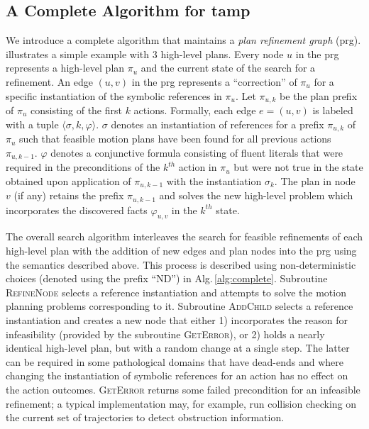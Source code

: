 \subsection{A Complete Algorithm for {\sc tamp}}
We introduce a complete algorithm that maintains a \emph{plan
  refinement graph} ({\sc prg}).  illustrates a simple example with 3 high-level plans.
Every node $u$ in the {\sc prg}
represents a high-level plan $\pi_u$ and the current state of the search
for a refinement. An edge $(u,v)$ in the {\sc prg}
represents a ``correction'' of $\pi_u$ for a specific instantiation of
the symbolic references in $\pi_u$. Let $\pi_{u,k}$ be the plan prefix of
$\pi_u$ consisting of the first $k$ actions. Formally, each edge
$e=(u,v)$ is labeled with a tuple $\langle \sigma, k, \varphi \rangle$.
$\sigma$ denotes an instantiation of references for a prefix $\pi_{u,k}$ of
$\pi_u$ such that feasible motion plans have been found for all
previous actions $\pi_{u,k-1}$. $\varphi$ denotes a conjunctive formula
consisting of fluent literals
that were required in the preconditions of the $k^{th}$ action in
$\pi_u$ but were not true in the state obtained upon
application of $\pi_{u,k-1}$ with the instantiation $\sigma_k$.  The
plan in node $v$ (if any) retains the prefix $\pi_{u,k-1}$ and solves
the new high-level problem which incorporates the discovered facts $\varphi_{u,v}$
in the $k^{th}$ state.

The overall search algorithm interleaves the search for feasible
refinements of each high-level plan with the addition
of new edges and plan nodes into the {\sc prg} using the semantics described
above. This process is described using non-deterministic choices
(denoted using the prefix ``ND'') in
Alg.\,\ref{alg:complete}. Subroutine \textsc{RefineNode} selects a
reference instantiation and attempts to solve the motion planning
problems corresponding to it. Subroutine \textsc{AddChild} selects a
reference instantiation and creates a new node that either 1)
incorporates the reason for infeasibility (provided by the
subroutine \textsc{GetError}), or 2) holds a nearly identical high-level plan,
but with a random change at a single step.
The latter can be required in some
pathological domains that have dead-ends and where changing the
instantiation of symbolic references for an action has no effect on the
action outcomes. \textsc{GetError} returns some failed precondition
for an infeasible refinement; a typical implementation may, for example, run collision
checking on the current set of trajectories to detect obstruction information.


